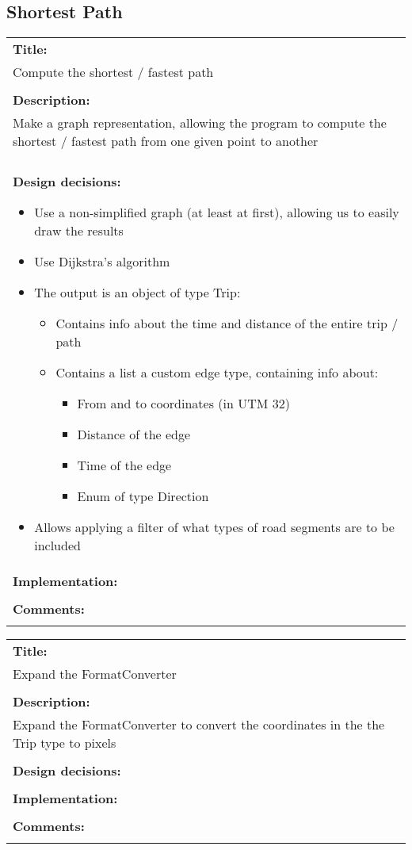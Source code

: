 \subsection*{Shortest Path}
\begin{tabular}{ | p{12cm} | }
	\hline
	\textbf{Title:} \\ 
	Compute the shortest / fastest path \\ 
	\\ \hline
	\textbf{Description:} \\
	Make a graph representation, allowing the program to compute the shortest / fastest path from one given point to another \\
	\\ \hline
	\textbf{Design decisions:}
	\begin{itemize}
		\item Use a non-simplified graph (at least at first), allowing us to easily draw the results
		\item Use Dijkstra’s algorithm
		\item The output is an object of type Trip:
		\begin{itemize}
			\item Contains info about the time and distance of the entire trip / path
			\item Contains a list a custom edge type, containing info about:
			\begin{itemize}
				\item From and to coordinates (in UTM 32)
				\item Distance of the edge
				\item Time of the edge
				\item Enum of type Direction
			\end{itemize}
		\end{itemize}
		\item Allows applying a filter of what types of road segments are to be included
	\end{itemize}
	\\ \hline
	\textbf{Implementation:} \\
	\\ \hline
	\textbf{Comments:} \\
	\\ \hline
\end{tabular}

\pagebreak
\begin{tabular}{ | p{12cm} | }
	\hline
	\textbf{Title:} \\
	Expand the FormatConverter \\
	\\ \hline
	\textbf{Description:} \\
	Expand the FormatConverter to convert the coordinates in the the Trip type to pixels \\
	\\ \hline
	\textbf{Design decisions:} \\
	\\ \hline
	\textbf{Implementation:} \\
	\\ \hline
	\textbf{Comments:} \\
	\\ \hline
\end{tabular}

